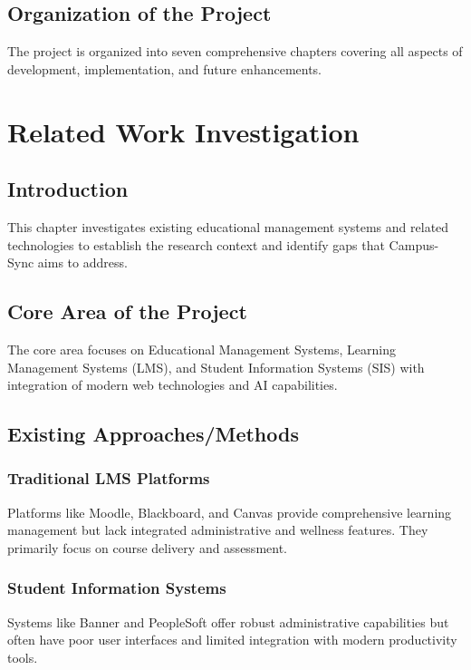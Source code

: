 \subsection{Organization of the Project}
The project is organized into seven comprehensive chapters covering all aspects of development, implementation, and future enhancements.

\newpage
\section{Related Work Investigation}

\subsection{Introduction}
This chapter investigates existing educational management systems and related technologies to establish the research context and identify gaps that Campus-Sync aims to address.

\subsection{Core Area of the Project}
The core area focuses on Educational Management Systems, Learning Management Systems (LMS), and Student Information Systems (SIS) with integration of modern web technologies and AI capabilities.

\subsection{Existing Approaches/Methods}

\subsubsection{Traditional LMS Platforms}
Platforms like Moodle, Blackboard, and Canvas provide comprehensive learning management but lack integrated administrative and wellness features. They primarily focus on course delivery and assessment.

\subsubsection{Student Information Systems}
Systems like Banner and PeopleSoft offer robust administrative capabilities but often have poor user interfaces and limited integration with modern productivity tools.

